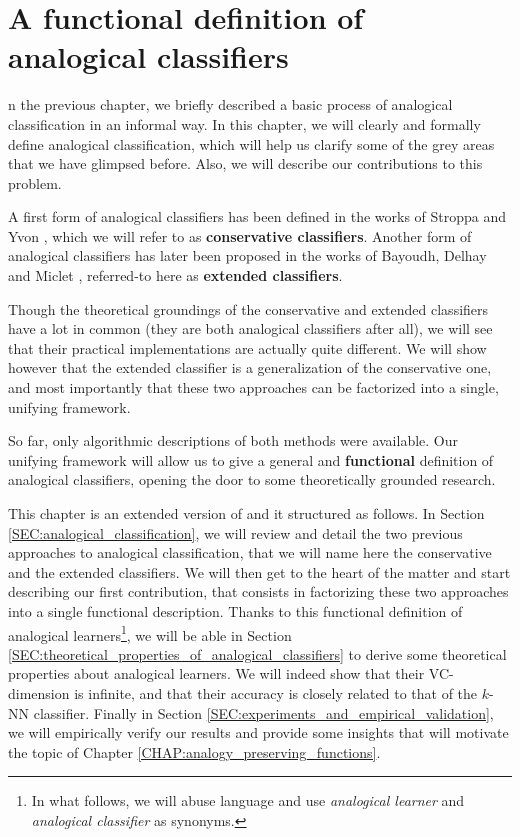 \chapter{A functional definition of analogical classifiers}
\label{CHAP:functional_definition}
\localtableofcontents*
\vspace*{\baselineskip}

n the previous chapter, we
briefly described a basic process of analogical classification in an informal
way. In this chapter, we will clearly and formally define analogical
classification, which will help us clarify some of the grey areas that we have
glimpsed before. Also, we will describe our contributions to this problem.

A first form of analogical classifiers has been defined in the works of Stroppa
and Yvon \cite{StrYvoCNLL05}, which we will refer to as \textbf{conservative
classifiers}. Another form of analogical classifiers has later been proposed in
the works of Bayoudh, Delhay and Miclet \cite{MicBayDelJAIR08,
BayMicDelIJCAI07}, referred-to here as \textbf{extended classifiers}.

Though the theoretical groundings of the conservative and extended
classifiers have a lot in common (they are both analogical classifiers after
all), we will see that their practical implementations are actually quite
different. We will show however that the extended classifier is a
generalization of the conservative one, and most importantly that these two
approaches can be factorized into a single, unifying framework.

So far, only algorithmic descriptions of both methods were available. Our
unifying framework will allow us to give a general and \textbf{functional}
definition of analogical classifiers, opening the door to some theoretically
grounded research.

This chapter is an extended version of \cite{HugPraRicSerECAI16} and it
structured as follows. In Section
\ref{SEC:analogical_classification}, we will review and detail the two previous
approaches to analogical classification, that we will name here the
conservative and the extended classifiers. We will then get to the heart of the
matter and start describing our first contribution, that consists in
factorizing these two approaches into a single functional description. Thanks to
this functional definition of analogical learners\footnote{In what follows, we
will abuse language and use \textit{analogical learner} and
\textit{analogical classifier} as synonyms.}, we will be able in Section
\ref{SEC:theoretical_properties_of_analogical_classifiers} to derive some
theoretical properties about analogical learners. We will indeed show that
their VC-dimension is infinite, and that their accuracy is closely related to
that of the $k$-NN classifier. Finally in Section
\ref{SEC:experiments_and_empirical_validation}, we will empirically verify our
results and provide some insights that will motivate the topic of Chapter
\ref{CHAP:analogy_preserving_functions}.

